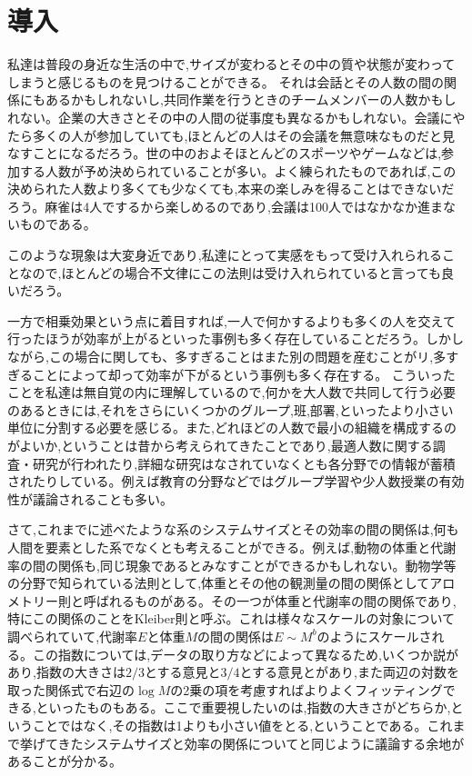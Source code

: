 \chapter{導入}

私達は普段の身近な生活の中で,サイズが変わるとその中の質や状態が変わってしまうと感じるものを見つけることができる。
それは会話とその人数の間の関係にもあるかもしれないし,共同作業を行うときのチームメンバーの人数かもしれない\cite{kaigi4}。企業の大きさとその中の人間の従事度も異なるかもしれない。会議にやたら多くの人が参加していても,ほとんどの人はその会議を無意味なものだと見なすことになるだろう。世の中のおよそほとんどのスポーツやゲームなどは,参加する人数が予め決められていることが多い。よく練られたものであれば,この決められた人数より多くても少なくても,本来の楽しみを得ることはできないだろう。麻雀は4人でするから楽しめるのであり,会議は100人ではなかなか進まないものである。

このような現象は大変身近であり,私達にとって実感をもって受け入れられることなので,ほとんどの場合不文律にこの法則は受け入れられていると言っても良いだろう。

一方で相乗効果という点に着目すれば,一人で何かするよりも多くの人を交えて行ったほうが効率が上がるといった事例も多く存在していることだろう。しかしながら,この場合に関しても、多すぎることはまた別の問題を産むことがリ,多すぎることによって却って効率が下がるという事例も多く存在する。
こういったことを私達は無自覚の内に理解しているので,何かを大人数で共同して行う必要のあるときには,それをさらにいくつかのグループ,班,部署,といったより小さい単位に分割する必要を感じる。また,どれほどの人数で最小の組織を構成するのがよいか,ということは昔から考えられてきたことであり,最適人数に関する調査・研究が行われたり,詳細な研究はなされていなくとも各分野での情報が蓄積されたりしている。例えば教育の分野などではグループ学習や少人数授業の有効性が議論されることも多い。

さて,これまでに述べたような系のシステムサイズとその効率の間の関係は,何も人間を要素とした系でなくとも考えることができる。例えば,動物の体重と代謝率の間の関係も,同じ現象であるとみなすことができるかもしれない。動物学等の分野で知られている法則として,体重とその他の観測量の間の関係としてアロメトリー則と呼ばれるものがある。その一つが体重と代謝率の間の関係であり,特にこの関係のことをKleiber則と呼ぶ。これは様々なスケールの対象について調べられていて,代謝率$E$と体重$M$の間の関係は$E\sim M^{b}$のようにスケールされる。この指数については,データの取り方などによって異なるため,いくつか説があり,指数の大きさは$2/3$とする意見と$3/4$とする意見とがあり,また両辺の対数を取った関係式で右辺の$\log M$の2乗の項を考慮すればよりよくフィッティングできる,といったものもある。ここで重要視したいのは,指数の大きさがどちらか,ということではなく,その指数は1よりも小さい値をとる,ということである。これまで挙げてきたシステムサイズと効率の関係についてと同じように議論する余地があることが分かる。

